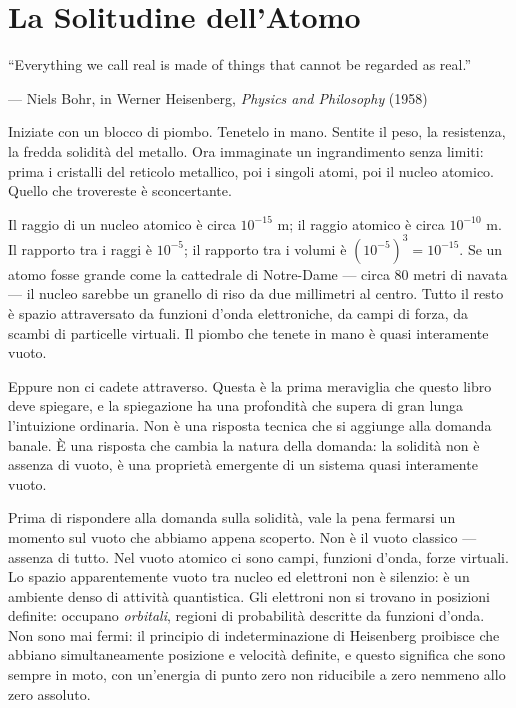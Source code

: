 \documentclass[12pt,a4paper,openany]{book}
\newcommand{\sezione}[1]{\vspace{1.2em}{\large\bfseries #1}\vspace{0.5em}\par}
\begin{document}
\chapter{La Solitudine dell'Atomo}

\epigraph{``Everything we call real is made of things that cannot be regarded as real.''}{--- Niels Bohr, in Werner Heisenberg, \textit{Physics and Philosophy} (1958)}

\sezione{Il paradosso della solidità}

Iniziate con un blocco di piombo. Tenetelo in mano. Sentite il peso, la resistenza, la fredda solidità del metallo. Ora immaginate un ingrandimento senza limiti: prima i cristalli del reticolo metallico, poi i singoli atomi, poi il nucleo atomico. Quello che trovereste è sconcertante.

Il raggio di un nucleo atomico è circa $10^{-15}$ m; il raggio atomico è circa $10^{-10}$ m. Il rapporto tra i raggi è $10^{-5}$; il rapporto tra i volumi è $(10^{-5})^3 = 10^{-15}$. Se un atomo fosse grande come la cattedrale di Notre-Dame — circa 80 metri di navata — il nucleo sarebbe un granello di riso da due millimetri al centro. Tutto il resto è spazio attraversato da funzioni d'onda elettroniche, da campi di forza, da scambi di particelle virtuali. Il piombo che tenete in mano è quasi interamente vuoto.

Eppure non ci cadete attraverso. Questa è la prima meraviglia che questo libro deve spiegare, e la spiegazione ha una profondità che supera di gran lunga l'intuizione ordinaria. Non è una risposta tecnica che si aggiunge alla domanda banale. È una risposta che cambia la natura della domanda: la solidità non è assenza di vuoto, è una proprietà emergente di un sistema quasi interamente vuoto.

\sezione{Un secondo sguardo al vuoto}

Prima di rispondere alla domanda sulla solidità, vale la pena fermarsi un momento sul vuoto che abbiamo appena scoperto. Non è il vuoto classico — assenza di tutto. Nel vuoto atomico ci sono campi, funzioni d'onda, forze virtuali. Lo spazio apparentemente vuoto tra nucleo ed elettroni non è silenzio: è un ambiente denso di attività quantistica. Gli elettroni non si trovano in posizioni definite: occupano \textit{orbitali}, regioni di probabilità descritte da funzioni d'onda. Non sono mai fermi: il principio di indeterminazione di Heisenberg proibisce che abbiano simultaneamente posizione e velocità definite, e questo significa che sono sempre in moto, con un'energia di punto zero non riducibile a zero nemmeno allo zero assoluto.
\end{document}
